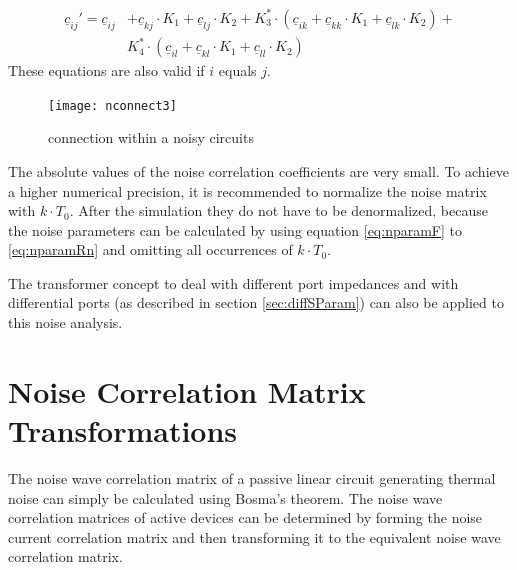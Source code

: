 \documentclass[10pt]{report}
\begin{document}
\begin{equation}
\begin{split}
\underline{c}_{ij}' = \underline{c}_{ij} &+ \underline{c}_{kj}\cdot K_1 + \underline{c}_{lj}\cdot K_2
   + K_3^*\cdot(\underline{c}_{ik} + \underline{c}_{kk}\cdot K_1 + \underline{c}_{lk}\cdot K_2) + \\
    &K_4^*\cdot(\underline{c}_{il} + \underline{c}_{kl}\cdot K_1 + \underline{c}_{ll}\cdot K_2)
\end{split}
\end{equation}
These equations are also valid if $i$ equals $j$.

\begin{figure}[ht]
\begin{center}
\texttt{[image: nconnect3]}
\end{center}
\caption{connection within a noisy circuits}
\label{fig:nconnect3}
\end{figure}
\FloatBarrier

The absolute values of the noise correlation coefficients are very
small.  To achieve a higher numerical precision, it is recommended to
normalize the noise matrix with $k\cdot T_0$. After the simulation
they do not have to be denormalized, because the noise parameters can
be calculated by using equation \eqref{eq:nparamF} to
\eqref{eq:nparamRn} and omitting all occurrences of $k\cdot T_0$.

\addvspace{12pt}

The transformer concept to deal with different port impedances and
with differential ports (as described in section \ref{sec:diffSParam})
can also be applied to this noise analysis.


\section{Noise Correlation Matrix Transformations}

The noise wave correlation matrix of a passive linear circuit
generating thermal noise can simply be calculated using Bosma's theorem.
The noise wave correlation matrices of active devices can be
determined by forming the noise current correlation matrix and then
transforming it to the equivalent noise wave correlation matrix.

\addvspace{12pt}
\end{document}
